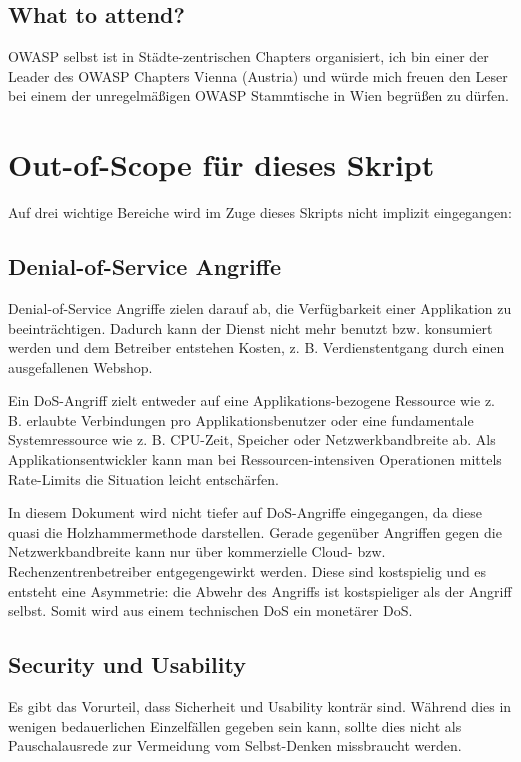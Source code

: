 \subsection{What to attend?}

OWASP selbst ist in Städte-zentrischen Chapters organisiert, ich bin einer der Leader des OWASP Chapters Vienna (Austria) und würde mich freuen den Leser bei einem der unregelmäßigen OWASP Stammtische in Wien begrüßen zu dürfen.

\section{Out-of-Scope für dieses Skript}

Auf drei wichtige Bereiche wird im Zuge dieses Skripts nicht implizit eingegangen:

\subsection{Denial-of-Service Angriffe}

Denial-of-Service Angriffe zielen darauf ab, die Verfügbarkeit einer Applikation zu beeinträchtigen. Dadurch kann der Dienst nicht mehr benutzt bzw. konsumiert werden und dem Betreiber entstehen Kosten, z. B. Verdienstentgang durch einen ausgefallenen Webshop.

Ein DoS-Angriff zielt entweder auf eine Applikations-bezogene Ressource wie z. B. erlaubte Verbindungen pro Applikationsbenutzer oder eine fundamentale Systemressource wie z. B. CPU-Zeit, Speicher oder Netzwerkbandbreite ab. Als Applikationsentwickler kann man bei Ressourcen-intensiven Operationen mittels Rate-Limits die Situation leicht entschärfen.

In diesem Dokument wird nicht tiefer auf DoS-Angriffe eingegangen, da diese quasi die Holzhammermethode darstellen. Gerade gegenüber Angriffen gegen die Netzwerkbandbreite kann nur über kommerzielle Cloud- bzw. Rechenzentrenbetreiber entgegengewirkt werden. Diese sind kostspielig und es entsteht eine Asymmetrie: die Abwehr des Angriffs ist kostspieliger als der Angriff selbst. Somit wird aus einem technischen DoS ein monetärer DoS.

\subsection{Security und Usability}

Es gibt das Vorurteil, dass Sicherheit und Usability konträr sind. Während dies in wenigen bedauerlichen Einzelfällen gegeben sein kann, sollte dies nicht als Pauschalausrede zur Vermeidung vom Selbst-Denken missbraucht werden.

